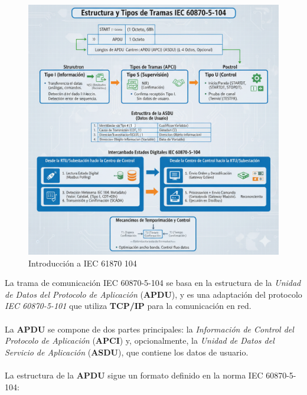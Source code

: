 \documentclass[a5paper]{book}%
\begin{document}
\begin{figure}[H]
  \caption{Introducción a IEC 61870 104}
  \label{fig:capa7iccp}
  \includegraphics[width=\linewidth]{resumen_iec_61870_104}
\end{figure}

La trama de comunicación IEC 60870-5-104 se basa en la estructura de la \textit{Unidad de Datos del Protocolo de Aplicación} (\textbf{APDU}), y es una adaptación del protocolo \textit{IEC 60870-5-101} que utiliza \textbf{TCP/IP} para la comunicación en red.\\\\

La \textbf{APDU} se compone de dos partes principales: la \textit{Información de Control del Protocolo de Aplicación }(\textbf{APCI}) y, opcionalmente, la \textit{Unidad de Datos del Servicio de Aplicación} (\textbf{ASDU}), que contiene los datos de usuario.\\\\

La estructura de la \textbf{APDU} sigue un formato definido en la norma IEC 60870-5-104:\\\\
\end{document}
